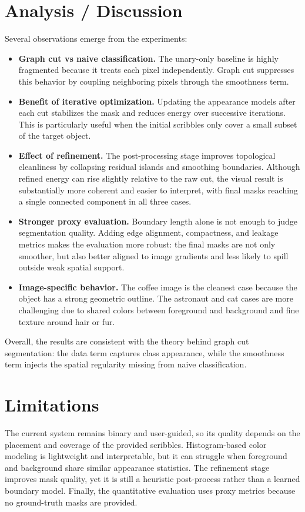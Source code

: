 \documentclass[conference]{IEEEtran}
\begin{document}
\section{Analysis / Discussion}
Several observations emerge from the experiments:
\begin{itemize}
  \item \textbf{Graph cut vs naive classification.} The unary-only baseline is highly fragmented because it treats each pixel independently. Graph cut suppresses this behavior by coupling neighboring pixels through the smoothness term.
  \item \textbf{Benefit of iterative optimization.} Updating the appearance models after each cut stabilizes the mask and reduces energy over successive iterations. This is particularly useful when the initial scribbles only cover a small subset of the target object.
  \item \textbf{Effect of refinement.} The post-processing stage improves topological cleanliness by collapsing residual islands and smoothing boundaries. Although refined energy can rise slightly relative to the raw cut, the visual result is substantially more coherent and easier to interpret, with final masks reaching a single connected component in all three cases.
  \item \textbf{Stronger proxy evaluation.} Boundary length alone is not enough to judge segmentation quality. Adding edge alignment, compactness, and leakage metrics makes the evaluation more robust: the final masks are not only smoother, but also better aligned to image gradients and less likely to spill outside weak spatial support.
  \item \textbf{Image-specific behavior.} The coffee image is the cleanest case because the object has a strong geometric outline. The astronaut and cat cases are more challenging due to shared colors between foreground and background and fine texture around hair or fur.
\end{itemize}

Overall, the results are consistent with the theory behind graph cut segmentation: the data term captures class appearance, while the smoothness term injects the spatial regularity missing from naive classification.

\section{Limitations}
The current system remains binary and user-guided, so its quality depends on the placement and coverage of the provided scribbles. Histogram-based color modeling is lightweight and interpretable, but it can struggle when foreground and background share similar appearance statistics. The refinement stage improves mask quality, yet it is still a heuristic post-process rather than a learned boundary model. Finally, the quantitative evaluation uses proxy metrics because no ground-truth masks are provided.
\end{document}
